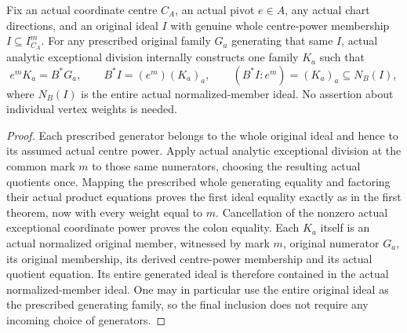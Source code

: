 \begin{theorem}
\label{hir:actual-common-mark-analytic-centre-quotients}
\leanok
Fix an actual coordinate centre $C_A$, an actual pivot $e\in A$, any actual chart directions, and an original ideal $I$ with genuine whole centre-power membership $I\subseteq I_{C_A}^m$. For any prescribed original family $G_a$ generating that same $I$, actual analytic exceptional division internally constructs one family $K_a$ such that
\[
 e^mK_a=B^*G_a,\qquad
 B^*I=(e^m)(K_a)_a,\qquad
 (B^*I:e^m)=(K_a)_a\subseteq N_B(I),
\]
where $N_B(I)$ is the entire actual normalized-member ideal. No assertion about individual vertex weights is needed.
\end{theorem}
\begin{proof}
Each prescribed generator belongs to the whole original ideal and hence to its assumed actual centre power. Apply actual analytic exceptional division at the common mark $m$ to those same numerators, choosing the resulting actual quotients once. Mapping the prescribed whole generating equality and factoring their actual product equations proves the first ideal equality exactly as in the first theorem, now with every weight equal to $m$. Cancellation of the nonzero actual exceptional coordinate power proves the colon equality. Each $K_a$ itself is an actual normalized original member, witnessed by mark $m$, original numerator $G_a$, its original membership, its derived centre-power membership and its actual quotient equation. Its entire generated ideal is therefore contained in the actual normalized-member ideal. One may in particular use the entire original ideal as the prescribed generating family, so the final inclusion does not require any incoming choice of generators.
\end{proof}

